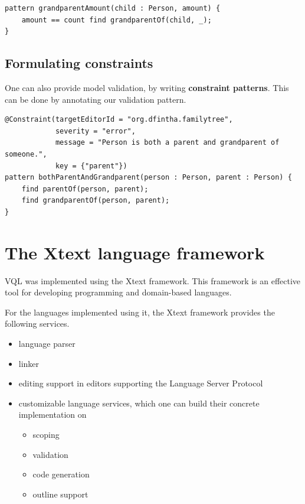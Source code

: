 \documentclass[11pt,a4paper,oneside]{report}
\begin{document}
\begin{lstlisting}[frame=single]
pattern grandparentAmount(child : Person, amount) {
    amount == count find grandparentOf(child, _);
}
\end{lstlisting}


\subsection{Formulating constraints}
One can also provide model validation, by writing \textbf{constraint patterns}.
This can be done by annotating our validation pattern.

\begin{lstlisting}[frame=single]
@Constraint(targetEditorId = "org.dfintha.familytree",
            severity = "error",
            message = "Person is both a parent and grandparent of someone.",
            key = {"parent"})
pattern bothParentAndGrandparent(person : Person, parent : Person) {
    find parentOf(person, parent);
    find grandparentOf(person, parent);
}
\end{lstlisting}

\section{The Xtext language framework}

VQL was implemented using the Xtext framework. This framework is an effective
tool for developing programming and domain-based languages.

For the languages implemented using it, the Xtext framework provides the
following services\cite{xtext}.

\begin{itemize}
    \item{language parser}
    \item{linker}
    \item{editing support in editors supporting the Language Server Protocol}
    \item{
        customizable language services, which one can build their concrete
        implementation on
        \begin{itemize}
            \item{scoping}
            \item{validation}
            \item{code generation}
            \item{outline support}
        \end{itemize}
    }
\end{itemize}
\end{document}
